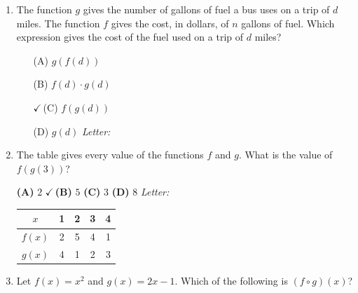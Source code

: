 \documentclass[10pt]{article}
\begin{document}
\begin{enumerate}[leftmargin=1.9em, itemsep=12pt]

\item The function $g$ gives the number of gallons of fuel a bus uses on a trip of $d$ miles.
      The function $f$ gives the cost, in dollars, of $n$ gallons of fuel. Which expression
      gives the cost of the fuel used on a trip of $d$ miles?
      \begin{enumerate}[leftmargin=2.6em, itemsep=2pt]
        \item[(A)] $g(f(d))$
        \item[(B)] $f(d) \cdot g(d)$
        \item[{\color{keyred}$\checkmark$\,(C)}] $f(g(d))$
        \item[(D)] $g(d)$ \hfill\textit{Letter:}~\gradedblank[id=ap1, type=choice, points=1, answer=C]{0.42in}{13pt}
      \end{enumerate}

\item \begin{minipage}[t]{0.52\linewidth}
      The table gives every value of the functions $f$ and $g$. What is the value of
      $f(g(3))$?

      \smallskip
      \textbf{(A)} $2$ \hspace{1.6em} {\color{keyred}\textbf{$\checkmark$\,(B)}} $5$ \hspace{1.6em}
      \textbf{(C)} $3$ \hspace{1.6em} \textbf{(D)} $8$ \hfill\textit{Letter:}~\gradedblank[id=ap2, type=choice, points=1, answer=B]{0.42in}{13pt}
      \end{minipage}\hfill
      \begin{minipage}[t]{0.42\linewidth}
      \vspace{-2pt}
      \centering
      \renewcommand{\arraystretch}{1.3}
      \begin{tabular}{|c|c|c|c|c|}
      \hline
      $x$ & 1 & 2 & 3 & 4 \\
      \hline
      $f(x)$ & 2 & 5 & 4 & 1 \\
      \hline
      $g(x)$ & 4 & 1 & 2 & 3 \\
      \hline
      \end{tabular}
      \end{minipage}

\item Let $f(x) = x^2$ and $g(x) = 2x - 1$. Which of the following is $(f \circ g)(x)$?


\end{enumerate}
\end{document}
